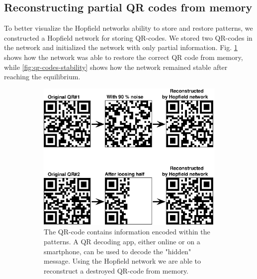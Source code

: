 \subsection{Reconstructing partial QR codes from memory} \label{sec:qr-codes}
To better visualize the Hopfield networks ability to store and restore patterns, we constructed a Hopfield network for storing QR-codes. We stored two QR-codes in the network and initialized the network with only partial information. Fig. \ref{fig:qr-codes} shows how the network was able to restore the correct QR code from memory, while \cref{fig:qr-codes-stability} shows how the network remained stable after reaching the equilibrium. 
\begin{figure}[H]
    \centering
    \captionsetup[subfigure]{width=0.9\textwidth, justification=raggedright}
    \begin{subfigure}{0.49\textwidth}
        \includegraphics[width=\textwidth]{figs/qr-code}
        \caption{The QR-code contains information encoded within the patterns. A QR decoding app, either online or on a smartphone, can be used to decode the "hidden" message. Using the Hopfield network we are able to reconstruct a destroyed QR-code from memory.}
        \label{fig:qr-codes}
    \end{subfigure}
    \begin{subfigure}{0.49\textwidth}

\end{subfigure}
\end{figure}
